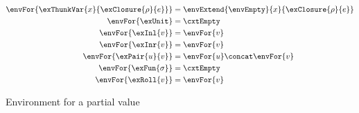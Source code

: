 \begin{figure}[H]
\noindent {}
{\small
\begin{align*}
\envFor{\exThunkVar{x}{\exClosure{\rho}{e}}}
&=
\envExtend{\envEmpty}{x}{\exClosure{\rho}{e}}
\\
\envFor{\exUnit}
&=
\cxtEmpty
\\
\envFor{\exInl{v}}
&=
\envFor{v}
\\
\envFor{\exInr{v}}
&=
\envFor{v}
\\
\envFor{\exPair{u}{v}}
&=
\envFor{u} \concat \envFor{v}
\\
\envFor{\exFun{\sigma}}
&=
\cxtEmpty
\\
\envFor{\exRoll{v}}
&=
\envFor{v}
\end{align*}
}
\caption{Environment for a partial value}
\label{fig:env-for-value}
\end{figure}
